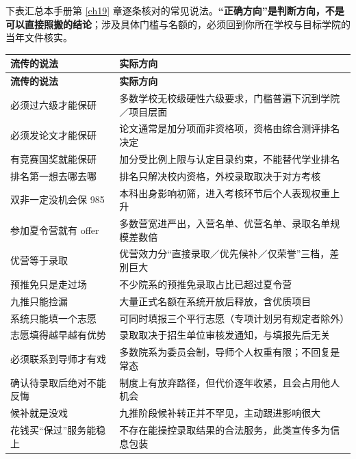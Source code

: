 下表汇总本手册第 \ref{ch19} 章逐条核对的常见说法。\textbf{“正确方向”是判断方向，不是可以直接照搬的结论}；涉及具体门槛与名额的，必须回到你所在学校与目标学院的当年文件核实。

\begin{longtable}{p{6.4cm}p{9.6cm}}
\toprule
\textbf{流传的说法} & \textbf{实际方向} \\ \midrule
\endfirsthead
\toprule
\textbf{流传的说法} & \textbf{实际方向} \\ \midrule
\endhead
必须过六级才能保研 & 多数学校无校级硬性六级要求，门槛普遍下沉到学院／项目层面 \\
必须发论文才能保研 & 论文通常是加分项而非资格项，资格由综合测评排名决定 \\
有竞赛国奖就能保研 & 加分受比例上限与认定目录约束，不能替代学业排名 \\
排名第一想去哪去哪 & 排名只解决校内资格，外校录取取决于对方考核 \\
双非一定没机会保 985 & 本科出身影响初筛，进入考核环节后个人表现权重上升 \\
参加夏令营就有 offer & 多数营宽进严出，入营名单、优营名单、录取名单规模差数倍 \\
优营等于录取 & 优营效力分“直接录取／优先候补／仅荣誉”三档，差別巨大 \\
预推免只是走过场 & 不少院系的预推免录取占比已超过夏令营 \\
九推只能捡漏 & 大量正式名额在系统开放后释放，含优质项目 \\
系统只能填一个志愿 & 可同时填报三个平行志愿（专项计划另有规定者除外） \\
志愿填得越早越有优势 & 录取取决于招生单位审核发通知，与填报先后无关 \\
必须联系到导师才有戏 & 多数院系为委员会制，导师个人权重有限；不回复是常态 \\
确认待录取后绝对不能反悔 & 制度上有放弃路径，但代价逐年收紧，且会占用他人机会 \\
候补就是没戏 & 九推阶段候补转正并不罕见，主动跟进影响很大 \\
花钱买“保过”服务能稳上 & 不存在能操控录取结果的合法服务，此类宣传多为信息包装 \\
\bottomrule
\end{longtable}

